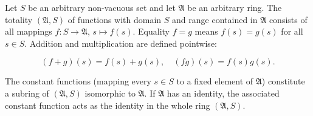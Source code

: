 Let $S$ be an arbitrary non-vacuous set and let $\mathfrak{A}$ be an arbitrary ring. The totality $(\mathfrak{A}, S)$ of functions with domain $S$ and range contained in $\mathfrak{A}$ consists of all mappings $f: S \to \mathfrak{A}$, $s \mapsto f(s)$. Equality $f = g$ means $f(s) = g(s)$ for all $s \in S$. Addition and multiplication are defined pointwise:

$$(f + g)(s) = f(s) + g(s), \quad (fg)(s) = f(s)g(s).$$

The constant functions (mapping every $s \in S$ to a fixed element of $\mathfrak{A}$) constitute a subring of $(\mathfrak{A}, S)$ isomorphic to $\mathfrak{A}$. If $\mathfrak{A}$ has an identity, the associated constant function acts as the identity in the whole ring $(\mathfrak{A}, S)$.
